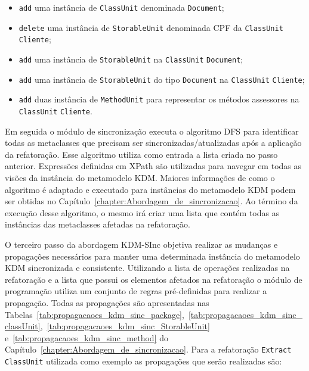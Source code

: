 \begin{itemize}

\item \texttt{add} uma instância de \texttt{ClassUnit} denominada \texttt{Document};

\item \texttt{delete} uma instância de \texttt{StorableUnit} denominada CPF da \texttt{ClassUnit} \texttt{Cliente};

\item \texttt{add} uma instância de \texttt{StorableUnit} na \texttt{ClassUnit} \texttt{Document};

\item \texttt{add} uma instância de \texttt{StorableUnit} do tipo \texttt{Document} na \texttt{ClassUnit} \texttt{Cliente};

\item \texttt{add} duas instância de \texttt{MethodUnit} para representar os métodos assessores na \texttt{ClassUnit} \texttt{Cliente}.
\end{itemize}

Em seguida o módulo de sincronização executa o algoritmo DFS para identificar todas as metaclasses que precisam ser sincronizadas/atualizadas após a aplicação da refatoração. Esse algoritmo utiliza como entrada a lista criada no passo anterior. Expressões definidas em XPath são utilizadas para navegar em todas as visões da instância do metamodelo KDM. Maiores informações de como o algoritmo é adaptado e executado para instâncias do metamodelo KDM podem ser obtidas no Capítulo~\ref{chapter:Abordagem_de_sincronizacao}. Ao término da execução desse algoritmo, o mesmo irá criar uma lista que contém todas as instâncias das metaclasses afetadas na refatoração. 
   

O terceiro passo da abordagem KDM-SInc objetiva realizar as mudanças e propagações necessários para manter uma determinada instância do metamodelo KDM sincronizada e consistente. Utilizando a lista de operações realizadas na refatoração e a lista que possui os elementos afetados na refatoração o módulo de programação utiliza um conjunto de regras pré-definidas para realizar a propagação. Todas as propagações são apresentadas nas Tabelas~\ref{tab:propagacaoes_kdm_sinc_package},~\ref{tab:propagacaoes_kdm_sinc_classUnit},~\ref{tab:propagacaoes_kdm_sinc_StorableUnit} e~\ref{tab:propagacaoes_kdm_sinc_method} do Capítulo~\ref{chapter:Abordagem_de_sincronizacao}. Para a refatoração \texttt{Extract ClassUnit} utilizada como exemplo as propagações que serão realizadas são:


